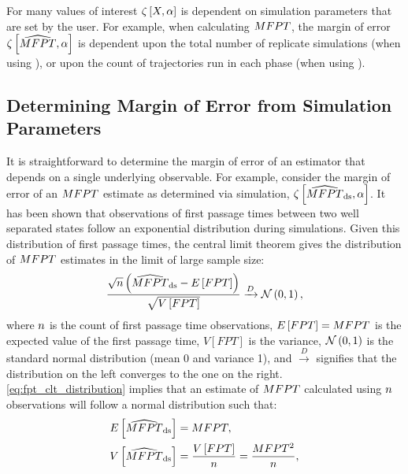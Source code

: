 For many values of interest $\zeta \left[ X, \alpha \right]$ is dependent on simulation parameters that are set by the user. For example, when calculating $MFPT$, the margin of error $\zeta \left[ \widehat{MFPT}, \alpha \right]$ is dependent upon the total number of replicate simulations (when using ), or upon the count of trajectories run in each phase (when using ).


\subsection{Determining Margin of Error from Simulation Parameters}
\label{sec:moe_from_simulation_params}
It is straightforward to determine the margin of error of an estimator that depends on a single underlying observable. For example, consider the margin of error of an $MFPT$ estimate as determined via  simulation, $\zeta \left[ \widehat{MFPT}_{\text{ds}}, \alpha \right]$. It has been shown that observations of first passage times between two well separated states follow an exponential distribution during  simulations\supercite{Becker:2012ej}. Given this distribution of first passage times, the central limit theorem\supercite{Olive:2014by} gives the distribution of $MFPT$ estimates in the limit of large sample size:
    \begin{equation}
    \label{eq:fpt_clt_distribution}
        \frac{\sqrt{n} \left(\widehat{MFPT}_{\text{ds}} - E \left[ FPT \right]\right) }{\sqrt{V \left[ FPT \right]}} \xrightarrow{D} \mathcal{N}\left( 0 , 1 \right),
    \end{equation}
where $n$ is the count of first passage time observations, $E \left[ FPT \right] = MFPT$ is the expected value of the first passage time, $V[FPT]$ is the variance, $\mathcal{N}\left( 0 , 1 \right)$ is the standard normal distribution (\ie mean 0 and variance 1), and $\xrightarrow{D}$ signifies that the distribution on the left converges to the one on the right. \eqref{eq:fpt_clt_distribution} implies\supercite{Olive:2014by} that an estimate of $MFPT$ calculated using $n$ observations will follow a normal distribution such that:
    \begin{align}
        \label{eq:mfptestds_moments}
        \begin{split}
            E \left[ \widehat{MFPT}_{\text{ds}} \right] &= MFPT, \\
            V \left[ \widehat{MFPT}_{\text{ds}} \right] &= \frac{V \left[ FPT \right]}{n} = \frac{MFPT^2}{n},
        \end{split}
    \end{align}
